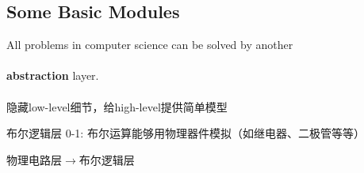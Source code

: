 \documentclass{myslide}
\begin{document}
\subsection{Some Basic Modules}
\begin{frame}
\subsectionpage
\end{frame}

\begin{frame}
\begin{center}
All problems in computer science can be solved by another\\
\quad\\
{\textbf{\huge{abstraction}}} layer.\\
\quad\\
隐藏low-level细节，给high-level提供简单模型
\end{center}
\end{frame}

\begin{frame}{布尔逻辑层}
0-1: 布尔运算能够用物理器件模拟（如继电器、二极管等等）
\pause
\begin{center}
物理电路层$\to$布尔逻辑层
\end{center}
\end{frame}
\end{document}
